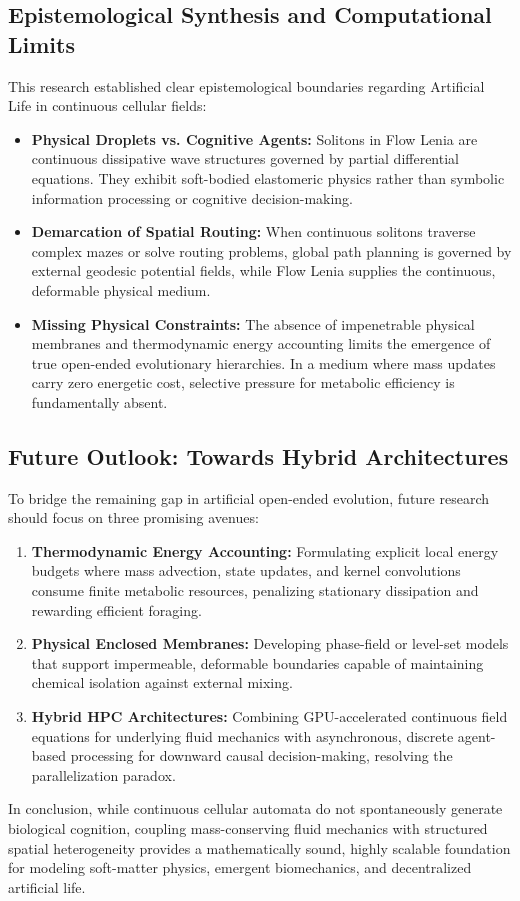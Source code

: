 \subsection{Epistemological Synthesis and Computational Limits}
\label{subsec:concl_epistemology}

This research established clear epistemological boundaries regarding Artificial Life in continuous cellular fields:
\begin{itemize}
    \item \textbf{Physical Droplets vs. Cognitive Agents:} Solitons in Flow Lenia are continuous dissipative wave structures governed by partial differential equations. They exhibit soft-bodied elastomeric physics rather than symbolic information processing or cognitive decision-making.
    \item \textbf{Demarcation of Spatial Routing:} When continuous solitons traverse complex mazes or solve routing problems, global path planning is governed by external geodesic potential fields, while Flow Lenia supplies the continuous, deformable physical medium.
    \item \textbf{Missing Physical Constraints:} The absence of impenetrable physical membranes and thermodynamic energy accounting limits the emergence of true open-ended evolutionary hierarchies. In a medium where mass updates carry zero energetic cost, selective pressure for metabolic efficiency is fundamentally absent.
\end{itemize}

\subsection{Future Outlook: Towards Hybrid Architectures}
\label{subsec:concl_future_work}

To bridge the remaining gap in artificial open-ended evolution, future research should focus on three promising avenues:
\begin{enumerate}
    \item \textbf{Thermodynamic Energy Accounting:} Formulating explicit local energy budgets where mass advection, state updates, and kernel convolutions consume finite metabolic resources, penalizing stationary dissipation and rewarding efficient foraging.
    \item \textbf{Physical Enclosed Membranes:} Developing phase-field or level-set models that support impermeable, deformable boundaries capable of maintaining chemical isolation against external mixing.
    \item \textbf{Hybrid HPC Architectures:} Combining GPU-accelerated continuous field equations for underlying fluid mechanics with asynchronous, discrete agent-based processing for downward causal decision-making, resolving the parallelization paradox.
\end{enumerate}

In conclusion, while continuous cellular automata do not spontaneously generate biological cognition, coupling mass-conserving fluid mechanics with structured spatial heterogeneity provides a mathematically sound, highly scalable foundation for modeling soft-matter physics, emergent biomechanics, and decentralized artificial life.